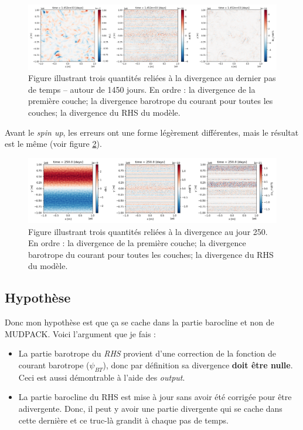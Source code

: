 \documentclass[10pt]{article}
\numberwithin{equation}{section}
\begin{document}
\begin{figure}[htbp]
\centering
\includegraphics[width=.9\linewidth]{figures/debuggage/2023_07_010_3div1.png}
\caption{\label{fig:org6308a2e}Figure illustrant trois quantités reliées à la divergence au dernier pas de temps -- autour de 1450 jours. En ordre : la divergence de la première couche; la divergence barotrope du courant pour toutes les couches; la divergence du RHS du modèle.}
\end{figure}

Avant le \emph{spin up}, les erreurs ont une forme légèrement différentes, mais le résultat est le même (voir figure \ref{fig:orgcc94bfe}).

\begin{figure}[htbp]
\centering
\includegraphics[width=.9\linewidth]{figures/debuggage/2023_07_010_3div1_t250.png}
\caption{\label{fig:orgcc94bfe}Figure illustrant trois quantités reliées à la divergence au jour 250. En ordre : la divergence de la première couche; la divergence barotrope du courant pour toutes les couches; la divergence du RHS du modèle.}
\end{figure}
\subsection{Hypothèse}
\label{sec:org6b49099}
Donc mon hypothèse est que ça se cache dans la partie barocline et non de MUDPACK.
Voici l'argument que je fais :
\begin{itemize}
\item La partie barotrope du \emph{RHS} provient d'une correction de la fonction de courant barotrope (\(\psi_{BT}\)), donc par définition sa divergence \textbf{doit être nulle}. Ceci est aussi démontrable à l'aide des \emph{output}.
\item La partie barocline du RHS est mise à jour sans avoir été corrigée pour être adivergente.
Donc, il peut y avoir une partie divergente qui se cache dans cette dernière et ce truc-là grandit à chaque pas de temps.
\end{itemize}
\end{document}
